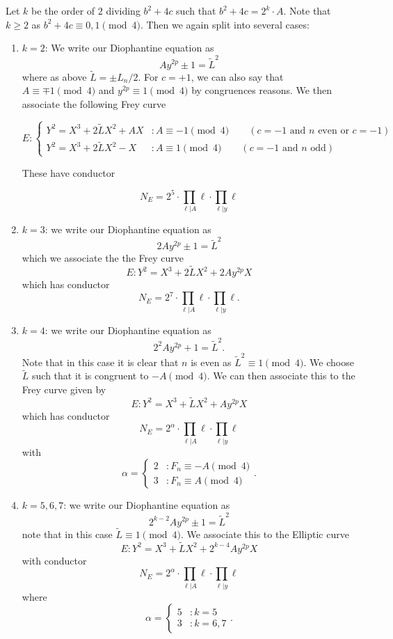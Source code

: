 \documentclass[12pt]{article}
\begin{document}
\begin{enumerate}
Let $k$ be the order of $2$ dividing $b^2+4c$ such that $b^2 + 4c = 2^k \cdot A$.  Note that $k \geq 2$ as $b^2 + 4c \equiv 0,1 \pmod{4}$.  Then we again split into several cases:

\begin{enumerate}

\item $k = 2$:  We write our Diophantine equation as
\[ A y^{2p} \pm 1 = \tilde{L}^2 \]
where as above $\tilde{L} = \pm L_n/2$.  For $c=  +1$, we can also say that $A \equiv \mp 1 \pmod{4}$ and $y^{2p} \equiv 1 \pmod{4}$ by congruences reasons.  We then associate the following Frey curve

\[ E : \begin{cases} Y^2 = X^3 + 2 \tilde{L}X^2 + A X & : A \equiv -1 \pmod{4} \qquad (c = -1 \text{ and } n \text{ even or } c = -1) \\  Y^2 = X^3 + 2 \tilde{L}X^2 - X & : A \equiv 1 \pmod{4} \qquad (c = -1 \text{ and } n \text{ odd}) \end{cases} \]

These have conductor

\[ N_E =  2^5 \cdot \prod_{\ell |  A} \ell \cdot \prod_{\ell | y} \ell \]


\item $k =3$: we write our Diophantine equation as
\[ 2A y^{2p} \pm 1 = \tilde{L}^2 \]
which we associate the the Frey curve
\[ E : Y^2 = X^3 + 2\tilde{L}X^2 + 2Ay^{2p} X \]
which has conductor
\[ N_E = 2^7 \cdot \prod_{\ell | A} \ell \cdot \prod_{\ell | y} \ell. \]

\item $k = 4$: we write our Diophantine equation as
\[ 2^2A y^{2p} + 1  = \tilde{L}^2. \]
Note that in this case it is clear that $n$ is even as $\tilde{L}^2 \equiv 1 \pmod{4}$.  We choose $\tilde{L}$ such that it is congruent to $-A \pmod{4}$.  We can then associate this to the Frey curve given by
\[ E: Y^2 = X^3 + \tilde{L}X^2 + Ay^{2p}X \]
which has conductor
\[N_E = 2^\alpha \cdot \prod_{\ell | A} \ell \cdot \prod_{\ell | y} \ell \]
with 
\[ \alpha = \begin{cases} 2 & : F_n \equiv -A \pmod{4} \\ 3 & : F_n \equiv  A \pmod{4} \end{cases} .\]


\item $k=5, 6, 7$: we write our Diophantine equation as
\[ 2^{k-2}A y^{2p} \pm 1 = \tilde{L}^2 \]
note that in this case $\tilde{L} \equiv 1 \pmod{4}$.  We associate this to the Elliptic curve
\[ E: Y^2 = X^3 + \tilde{L}X^2 + 2^{k-4}A y^{2p} X \]
with conductor
\[ N_E = 2^\alpha \cdot \prod_{\ell | A} \ell \cdot \prod_{\ell | y} \ell \]
where
\[ \alpha = \begin{cases} 5 & : k = 5 \\ 3 & : k = 6,7 \end{cases} .\]


\end{enumerate}
\end{enumerate}
\end{document}
